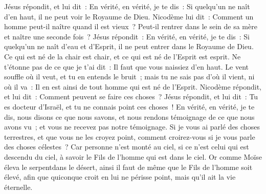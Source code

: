 \begin{multicols}{2}
Jésus répondit, et lui dit~: En vérité, en vérité, je te dis~: Si quelqu'un ne naît d'en haut, il ne peut voir le Royaume de Dieu.
Nicodème lui dit~: Comment un homme peut-il naître quand il est vieux~? Peut-il rentrer dans le sein de sa mère et naître une seconde fois~?
Jésus répondit~: En vérité, en vérité, je te dis~: Si quelqu'un ne naît d'eau et d'Esprit, il ne peut entrer dans le Royaume de Dieu.
Ce qui est né de la chair est chair, et ce qui est né de l'Esprit est esprit.
Ne t'étonne pas de ce que je t'ai dit~: Il faut que vous naissiez d'en haut.
Le vent souffle où il veut, et tu en entends le bruit~; mais tu ne sais pas d'où il vient, ni où il va~: Il en est ainsi de tout homme qui est né de l'Esprit.
Nicodème répondit, et lui dit~: Comment peuvent se faire ces choses~?
Jésus répondit, et lui dit~: Tu es docteur d'Israël, et tu ne connais point ces choses~!
En vérité, en vérité, je te dis, nous disons ce que nous savons, et nous rendons témoignage de ce que nous avons vu~; et vous ne recevez pas notre témoignage.
Si je vous ai parlé des choses terrestres, et que vous ne les croyez point, comment croirez-vous si je vous parle des choses célestes~?
Car personne n'est monté au ciel, si ce n'est celui qui est descendu du ciel, à savoir le Fils de l'homme qui est dans le ciel.
Or comme Moïse éleva le serpentdans le désert, ainsi il faut de même que le Fils de l'homme soit élevé,
afin que quiconque croit en lui ne périsse point, mais qu'il ait la vie éternelle.

\end{multicols}
